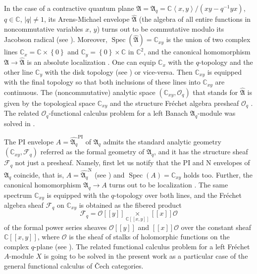 \documentclass[12pt]{amsart}%
\theoremstyle{plain}
\numberwithin{equation}{section}
\numberwithin{equation}{section}
\numberwithin{theorem}{section}
\numberwithin{lemma}{section}
\numberwithin{remark}{section}
\numberwithin{example}{section}
\numberwithin{proposition}{section}
\numberwithin{definition}{section}
\numberwithin{corollary}{section}
\begin{document}
In the case of a contractive quantum plane $\mathfrak{A=A}_{q}=\mathbb{C}%
\left\langle x,y\right\rangle /\left(  xy-q^{-1}yx\right)  $, $q\in\mathbb{C}%
$, $\left\vert q\right\vert \neq1$, its Arens-Michael envelope
$\widehat{\mathfrak{A}}$ (the algebra of all entire functions in
noncommutative variables $x$, $y$) turns out to be commutative modulo its
Jacobson radical (see \cite{Dosi24}). Moreover, $\operatorname{Spec}\left(
\widehat{\mathfrak{A}}\right)  =\mathbb{C}_{xy}$ is the union of two complex
lines $\mathbb{C}_{x}=\mathbb{C\times}\left\{  0\right\}  $ and $\mathbb{C}%
_{y}=\left\{  0\right\}  \times\mathbb{C}$ in $\mathbb{C}^{2}$, and the
canonical homomorphism $\mathfrak{A}\rightarrow\widehat{\mathfrak{A}}$ is an
absolute localization \cite{Pir}. One can equip $\mathbb{C}_{x}$ with the
$q$-topology and the other line $\mathbb{C}_{y}$ with the disk topology (see
\cite{Dosi24}) or vice-versa. Then $\mathbb{C}_{xy}$ is equipped with the
final topology so that both inclusions of these lines into $\mathbb{C}_{xy}$
are continuous. The (noncommutative) analytic space $\left(  \mathbb{C}%
_{xy},\mathcal{O}_{q}\right)  $ that stands for $\widehat{\mathfrak{A}}$ is
given by the topological space $\mathbb{C}_{xy}$ and the structure Fr\'{e}chet
algebra presheaf $\mathcal{O}_{q}$ \cite{Dosi24}. The related $\mathcal{O}%
_{q}$-functional calculus problem for a left Banach $\mathfrak{A}_{q}$-module
was solved in \cite{Dosi24}.

The PI envelope $A=\widehat{\mathfrak{A}_{q}}^{\text{PI}}$ of $\mathfrak{A}%
_{q}$ admits the standard analytic geometry $\left(  \mathbb{C}_{xy}%
,\mathcal{F}_{q}\right)  $ referred as the formal geometry of $\mathfrak{A}%
_{q}$, and it has the structure sheaf $\mathcal{F}_{q}$ not just a presheaf.
Namely, first let us notify that the PI and N envelopes of $\mathfrak{A}_{q}$
coincide, that is, $A=\widehat{\mathfrak{A}_{q}}^{\text{N}}$ (see
\cite{DosiSS}) and $\operatorname{Spec}\left(  A\right)  =\mathbb{C}_{xy}$
holds too. Further, the canonical homomorphism $\mathfrak{A}_{q}\rightarrow A$
turns out to be localization \cite{DosiLoc}. The same spectrum $\mathbb{C}%
_{xy}$ is equipped with the $q$-topology over both lines, and the Fr\'{e}chet
algebra sheaf $\mathcal{F}_{q}$ on $\mathbb{C}_{xy}$ is obtained as the
fibered product
\[
\mathcal{F}_{q}=\mathcal{O}\left[  \left[  y\right]  \right]
\underset{\mathbb{C}\left[  \left[  x,y\right]  \right]  }{\times}\left[
\left[  x\right]  \right]  \mathcal{O}%
\]
of the formal power series sheaves $\mathcal{O}\left[  \left[  y\right]
\right]  $ and $\left[  \left[  x\right]  \right]  \mathcal{O}$ over the
constant sheaf $\mathbb{C}\left[  \left[  x,y\right]  \right]  $, where
$\mathcal{O}$ is the sheaf of stalks of holomorphic functions on the complex
$q$-plane (see \cite{Dosi25}). The related functional calculus problem for a
left Fr\'{e}chet $A$-module $X$ is going to be solved in the present work as a
particular case of the general functional calculus of \v{C}ech categories.
\end{document}
